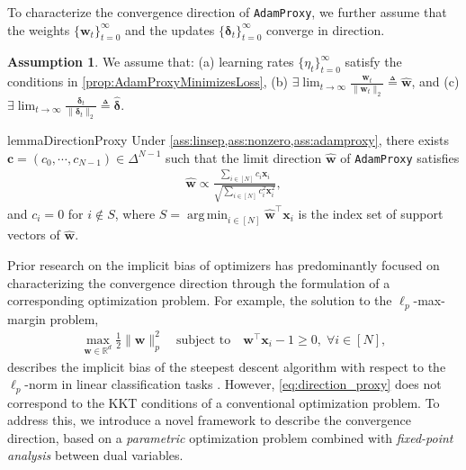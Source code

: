 \documentclass{article} %
\theoremstyle{plain}
\theoremstyle{definition}
\newtheorem{assumption}[theorem]{Assumption}
\theoremstyle{remark}
\def\sR{{\mathbb{R}}}
\DeclareMathOperator*{\argmin}{arg\,min}
\def\bdel{{\boldsymbol \delta}}
\def\bx{{\mathbf x}}
\def\bc{{\mathbf c}}
\def\bw{{\mathbf w}}
\begin{document}
To characterize the convergence direction of \texttt{AdamProxy}, we further assume that the weights $\{\bw_t\}_{t=0}^\infty$ and the updates $\{\bdel_t\}_{t=0}^\infty$ converge in direction.

\begin{assumption} \label{ass:adamproxy} 
We assume that: (a) learning rates $\{\eta_t\}_{t=0}^\infty$ satisfy the conditions in \cref{prop:AdamProxyMinimizesLoss}, (b) $\exists \lim_{t \rightarrow \infty} \frac{\bw_t}{\|\bw_t\|_2} \triangleq \hat{\bw}$,  and (c) $\exists \lim_{t \rightarrow \infty} \frac{\bdel_t}{\|\bdel_t\|_2} \triangleq \hat{\bdel}$.
\end{assumption}

\begin{restatable}{lemma}{DirectionProxy}\label{lemma:direction_proxy}
    Under \cref{ass:linsep,ass:nonzero,ass:adamproxy}, there exists $\bc=(c_0, \cdots, c_{N-1}) \in \Delta^{N-1}$ such that the limit direction $\hat{\bw}$ of \textnormal{\texttt{AdamProxy}} satisfies
    \begin{align} \label{eq:direction_proxy}
        \hat{\bw} \propto \frac{\sum_{i\in[N]} c_i\bx_i}{\sqrt{\sum_{i\in[N]} c_i^2 \bx_i^2}},
    \end{align}
    and $c_i=0$ for $i \notin S$, where $S=\argmin_{i \in [N]} \hat{\bw}^\top\bx_i$ is the index set of support vectors of $\hat{\bw}$.
\end{restatable}

Prior research on the implicit bias of optimizers has predominantly focused on characterizing the convergence direction through the formulation of a corresponding optimization problem. For example, the solution to the $\ell_p$-max-margin problem,
\begin{align*}
    \max_{\bw\in \sR^d} \frac{1}{2}\|\bw\|_p^2 \quad \text{subject to} \quad \bw^\top \bx_i -1 \geq 0,\; \forall i \in[N],
    \end{align*}
describes the implicit bias of the steepest descent algorithm with respect to the $\ell_p$-norm in linear classification tasks \citep{gunasekar2018characterizing}. However, \cref{eq:direction_proxy} does not correspond to the KKT conditions of a conventional optimization problem. To address this, we introduce a novel framework to describe the convergence direction, based on a \textit{parametric} optimization problem combined with \textit{fixed-point analysis} between dual variables.
\end{document}
